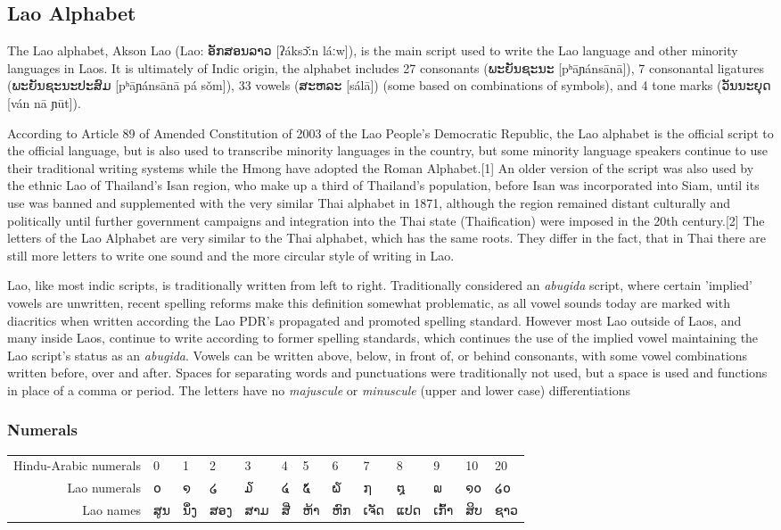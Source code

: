 \subsection{Lao Alphabet}

\newfontfamily{}

\def\laotext#1{{\lao#1}}

The Lao alphabet, Akson Lao (Lao: \laotext{ອັກສອນລາວ} [ʔáksɔ̌ːn láːw]), is the main script used to write the Lao language and other minority languages in Laos. It is ultimately of Indic origin, the alphabet includes 27 consonants (\laotext{ພະຍັນຊະນະ} [pʰāɲánsānā]), 7 consonantal ligatures (\laotext{ພະຍັນຊະນະປະສົມ} [pʰāɲánsānā pá sǒm]), 33 vowels (\laotext{ສະຫລະ} [sálā]) (some based on combinations of symbols), and 4 tone marks (\laotext{ວັນນະຍຸດ} [ván nā ɲūt]). 



According to Article 89 of Amended Constitution of 2003 of the Lao People's Democratic Republic, the Lao alphabet is the official script to the official language, but is also used to transcribe minority languages in the country, but some minority language speakers continue to use their traditional writing systems while the Hmong have adopted the Roman Alphabet.[1] An older version of the script was also used by the ethnic Lao of Thailand's Isan region, who make up a third of Thailand's population, before Isan was incorporated into Siam, until its use was banned and supplemented with the very similar Thai alphabet in 1871, although the region remained distant culturally and politically until further government campaigns and integration into the Thai state (Thaification) were imposed in the 20th century.[2] The letters of the Lao Alphabet are very similar to the Thai alphabet, which has the same roots. They differ in the fact, that in Thai there are still more letters to write one sound and the more circular style of writing in Lao.

Lao, like most indic scripts, is traditionally written from left to right. Traditionally considered an \emph{abugida} script, where certain 'implied' vowels are unwritten, recent spelling reforms make this definition somewhat problematic, as all vowel sounds today are marked with diacritics when written according the Lao PDR's propagated and promoted spelling standard. However most Lao outside of Laos, and many inside Laos, continue to write according to former spelling standards, which continues the use of the implied vowel maintaining the Lao script's status as an \emph{abugida}. Vowels can be written above, below, in front of, or behind consonants, with some vowel combinations written before, over and after. Spaces for separating words and punctuations were traditionally not used, but a space is used and functions in place of a comma or period. The letters have no \emph{majuscule} or \emph{minuscule} (upper and lower case) differentiations


\subsubsection{Numerals}
\bgroup
\lao
\begin{tabular}{rllllllllllll}
Hindu-Arabic numerals	&0	&1	&2	&3	&4	&5	&6	&7	&8	&9	&10 &	20\\
Lao numerals	&໐	&໑	&໒	&໓	&໔	&໕	&໖	&໗	&໘	&໙	&໑໐	&໒໐\\
Lao names	&ສູນ	&ນຶ່ງ	&ສອງ	&ສາມ	&ສີ່	&ຫ້າ 	&ຫົກ	&ເຈັດ	&ແປດ	&ເກົ້າ	&ສິບ	&ຊາວ\\
\end{tabular}
\egroup